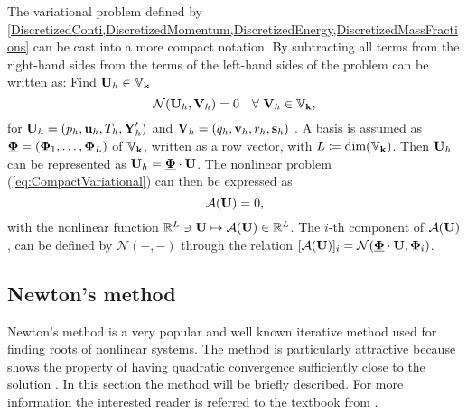 The variational problem defined by \cref*{DiscretizedConti,DiscretizedMomentum,DiscretizedEnergy,DiscretizedMassFractions} can be cast into a more compact notation. By subtracting all terms from the right-hand sides from the terms of the left-hand sides of  the problem can be written as:
Find $\textbf{U}_h \in \mathbb{V}_{\textbf{k}}$
\begin{equation}
	\mathcal{N}(\textbf{U}_h,\textbf{V}_h) = 0 \quad \forall \ \textbf{V}_h \in \mathbb{V}_{\textbf{k}} ,
	\label{eq:CompactVariational}
\end{equation}
for
$\textbf{U}_h = (p_h,\textbf{u}_h, T_h, \textbf{Y}'_h)$ and
$\textbf{V}_h = (q_h,\textbf{v}_h, r_h, \mathbf{s}_h)$
. A basis is assumed as
$\underline{\boldsymbol{\Phi}} = ( \boldsymbol{\Phi}_1, \ldots , \boldsymbol{\Phi}_L )$ of $\mathbb{V}_{\textbf{k}}$,
written as a row vector, with $L \coloneqq \textrm{dim}(\mathbb{V}_{\textbf{k}})$.
Then $\textbf{U}_h$ can be represented as
$ \textbf{U}_h =  \underline{ \boldsymbol{\Phi} } \cdot \textbf{U} $.
The nonlinear problem (\ref{eq:CompactVariational}) can then be expressed as
\begin{equation}
	\mathcal{A}(\textbf{U}) = 0 ,
	\label{Eq:nonLinSystem}
\end{equation}
with the nonlinear function
$\mathbb{R}^L \ni \textbf{U} \mapsto \mathcal{A}(\textbf{U}) \in \mathbb{R}^L$.
The $i$-th component of $ \mathcal{A}(\textbf{U})$, can be defined by $\mathcal{N}(-,-)$ through the relation
$[\mathcal{A}(\textbf{U})]_i = \mathcal{N}( \underline{ \boldsymbol{\Phi} } \cdot \textbf{U} , \boldsymbol{\Phi}_i)$.

\subsection{Newton's method}
Newton's method is a very popular and well known iterative method used for finding roots of nonlinear systems. The method is particularly attractive because shows the property of having quadratic convergence sufficiently close to the solution \textcite{deuflhardNewtonMethodsNonlinear2011}. In this section the method will be briefly described. For more information the interested reader is referred to the textbook from \textcite{kelleyIterativeMethodsLinear1995}. 

